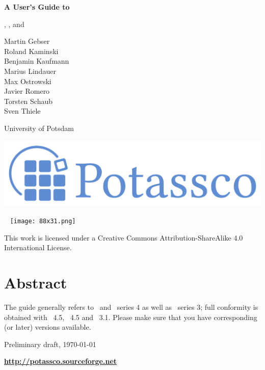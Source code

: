 \thispagestyle{empty}
\bigskip
\noindent
{\Huge\bf
A User's Guide to 
\par
\bigskip
\noindent
\gringo, \clasp, and \clingo}

\bigskip
\bigskip

\noindent
Martin Gebser \\
Roland Kaminski \\
Benjamin Kaufmann \\
Marius Lindauer \\
Max Ostrowski \\
Javier Romero \\
Torsten Schaub \\
Sven Thiele 
\par
\bigskip
\noindent
University of Potsdam

\vfill

\noindent
\includegraphics[width=\textwidth]{potassco_logo_blue}
\bigskip

\newpage
\thispagestyle{empty}\ 
\vfill
\noindent
\texttt{[image: 88x31.png]}

\medskip

\noindent
This work is licensed under a Creative Commons Attribution-ShareAlike 4.0 International License.
\newpage
\thispagestyle{empty}\ 
\section*{Abstract}


\bigskip
\noindent
The guide generally refers to \gringo\ and \clingo\ series 4 as well as \clasp\ series 3;
full conformity is obtained with \gringo~4.5, \clingo~4.5 and \clasp~3.1.
Please make sure that you have corresponding (or later) versions available.

\vfill

\begin{center}
  
\end{center}

\vfill

\noindent
Preliminary draft, \today\ %

\bigskip
\noindent
{\LARGE\bf\url{http://potassco.sourceforge.net}}





